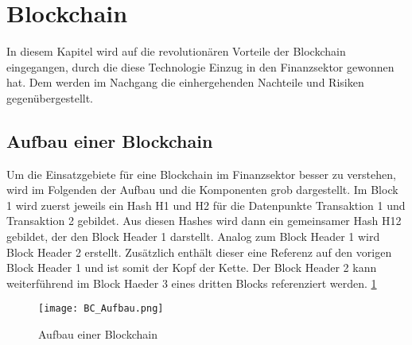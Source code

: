 \section{Blockchain}
In diesem Kapitel wird auf die revolutionären Vorteile der Blockchain 
eingegangen, durch die diese Technologie Einzug in den Finanzsektor gewonnen 
hat. Dem werden im Nachgang die einhergehenden Nachteile und Risiken gegenübergestellt. 

\subsection{Aufbau einer Blockchain}
\cite[p.~2]{pirafelnerblockchaintechnologie}
Um die Einsatzgebiete für eine Blockchain im Finanzsektor besser zu verstehen,
wird im Folgenden der Aufbau und die Komponenten grob dargestellt.
Im Block 1 wird zuerst jeweils ein Hash H1 und H2 für die Datenpunkte Transaktion 1 
und Transaktion 2 gebildet. Aus diesen Hashes wird dann ein gemeinsamer Hash H12 gebildet, 
der den Block Header 1 darstellt.
Analog zum Block Header 1 wird Block Header 2 erstellt. Zusätzlich enthält dieser eine
Referenz auf den vorigen Block Header 1 und ist somit der Kopf der Kette. Der Block Header 2
kann weiterführend im Block Haeder 3 eines dritten Blocks referenziert werden. 
\ref{fig:BC_Aufbau}

\begin{figure}[h]
    \texttt{[image: BC\_Aufbau.png]}
    \caption{Aufbau einer Blockchain}
    \label{fig:BC_Aufbau}
\end{figure}

\cite[p.~17f]{fill2020aufbau}

\subsection{}